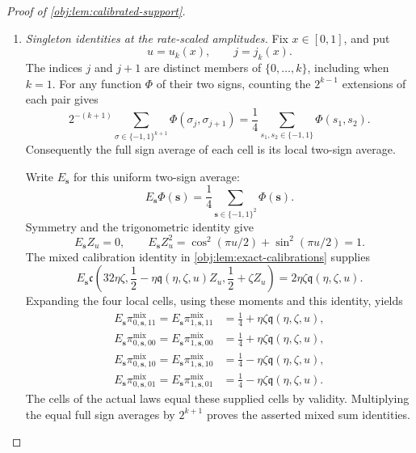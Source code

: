 \begin{proof}[Proof of \cref{obj:lem:calibrated-support}]
\begin{enumerate}
\item \textit{Singleton identities at the rate-scaled amplitudes.}
Fix \(x\in[0,1]\), and put
\[
u=u_k(x),\qquad j=j_k(x).
\]
The indices \(j\) and \(j+1\) are distinct members of \(\{0,\ldots,k\}\), including when \(k=1\). For any function \(\Phi\) of their two signs, counting the \(2^{k-1}\) extensions of each pair gives
\[
2^{-(k+1)}\sum_{\sigma\in\{-1,1\}^{k+1}}
                 \Phi(\sigma_j,\sigma_{j+1})
=\frac14\sum_{s_1,s_2\in\{-1,1\}}\Phi(s_1,s_2).
\]
Consequently the full sign average of each cell is its local two-sign average.

Write \(E_{\mathbf s}\) for this uniform two-sign average:
\[
E_{\mathbf s}\Phi(\mathbf s)
=\frac14\sum_{\mathbf s\in\{-1,1\}^2}\Phi(\mathbf s).
\]
Symmetry and the trigonometric identity give
\[
E_{\mathbf s}Z_u=0,\qquad
E_{\mathbf s}Z_u^2
=\cos^2(\pi u/2)+\sin^2(\pi u/2)=1.
\]
The mixed calibration identity in
\cref{obj:lem:exact-calibrations} supplies
\[
E_{\mathbf s}\mathfrak c\!\left(
32\eta\zeta,\frac12-\eta\mathfrak q(\eta,\zeta,u)Z_u,
                 \frac12+\zeta Z_u\right)
=2\eta\zeta\mathfrak q(\eta,\zeta,u).
\]
Expanding the four local cells, using these moments and this identity, yields
\[
\begin{aligned}
E_{\mathbf s}\pi^{\mathrm{mix}}_{0,\mathbf s,11}
=E_{\mathbf s}\pi^{\mathrm{mix}}_{1,\mathbf s,11}
&=\frac14+\eta\zeta\mathfrak q(\eta,\zeta,u),\\
E_{\mathbf s}\pi^{\mathrm{mix}}_{0,\mathbf s,00}
=E_{\mathbf s}\pi^{\mathrm{mix}}_{1,\mathbf s,00}
&=\frac14+\eta\zeta\mathfrak q(\eta,\zeta,u),\\
E_{\mathbf s}\pi^{\mathrm{mix}}_{0,\mathbf s,10}
=E_{\mathbf s}\pi^{\mathrm{mix}}_{1,\mathbf s,10}
&=\frac14-\eta\zeta\mathfrak q(\eta,\zeta,u),\\
E_{\mathbf s}\pi^{\mathrm{mix}}_{0,\mathbf s,01}
=E_{\mathbf s}\pi^{\mathrm{mix}}_{1,\mathbf s,01}
&=\frac14-\eta\zeta\mathfrak q(\eta,\zeta,u).
\end{aligned}
\]
The cells of the actual laws equal these supplied cells by validity. Multiplying the equal full sign averages by \(2^{k+1}\) proves the asserted mixed sum identities.


\end{enumerate}
\end{proof}
